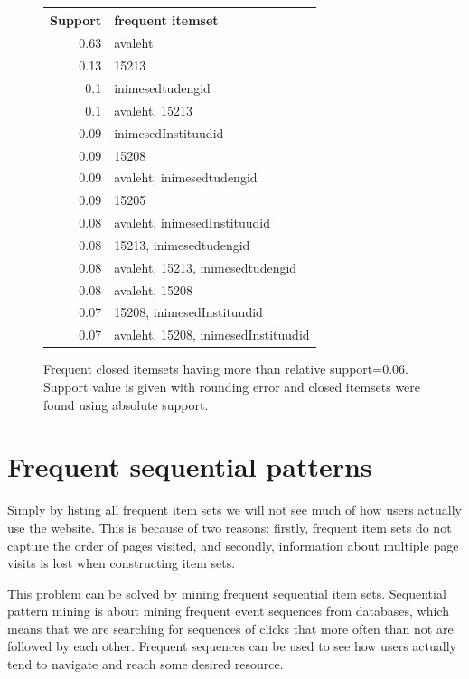 \documentclass[12pt, english,a4paper]{article}
\begin{document}
\begin{figure}[H]
  \centering
\begin{tabular}{ r | l }
Support & frequent itemset \\ \hline
0.63 & avaleht \\ \hline
0.13 & 15213 \\ \hline
0.1 & inimesedtudengid \\ \hline
0.1 & avaleht, 15213 \\ \hline
0.09 & inimesedInstituudid \\ \hline
0.09 & 15208 \\ \hline
0.09 & avaleht, inimesedtudengid \\ \hline
0.09 & 15205 \\ \hline
0.08 & avaleht, inimesedInstituudid \\ \hline
0.08 & 15213, inimesedtudengid \\ \hline
0.08 & avaleht, 15213, inimesedtudengid \\ \hline
0.08 & avaleht, 15208 \\ \hline
0.07 & 15208, inimesedInstituudid \\ \hline
0.07 & avaleht, 15208, inimesedInstituudid \\ \hline
\end{tabular}
  \caption{Frequent closed itemsets having more than relative support=$0.06$. Support value is given with rounding error and closed itemsets were found using absolute support.}
  \label{frequent_patterns}
\end{figure}


\section{Frequent sequential patterns}
Simply by listing all frequent item sets we will not see much of how users actually use the website. This is because of two reasons: firstly, frequent item sets do not capture the order of pages visited, and secondly, information about multiple page visits is lost when constructing item sets.

This problem can be solved by mining frequent sequential item sets. Sequential pattern mining is about mining frequent event sequences from databases, which means that we are searching for sequences of clicks that more often than not are followed by each other. Frequent sequences can be used to see how users actually tend to navigate and reach some desired resource.
\end{document}
